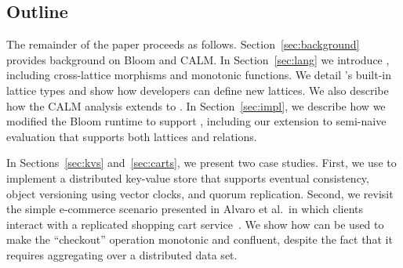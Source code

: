 % 

\subsection{Outline}
The remainder of the paper proceeds as follows.  Section~\ref{sec:background}
provides background on Bloom and CALM.  In Section~\ref{sec:lang} we introduce
\lang, including cross-lattice morphisms and monotonic functions. We detail
\lang's built-in lattice types and show how developers can define new lattices.
We also describe how the CALM analysis extends to \lang.  In
Section~\ref{sec:impl}, we describe how we modified the Bloom runtime to support
\lang, including our extension to semi-naive evaluation that supports both
lattices and relations.

In Sections~\ref{sec:kvs} and~\ref{sec:carts}, we present two case studies.
First, we use \lang to implement a distributed key-value store that supports
eventual consistency, object versioning using vector clocks, and quorum
replication. Second, we revisit the simple e-commerce scenario presented in
Alvaro et al.\ in which clients interact with a replicated shopping cart
service~\cite{Alvaro2011}. We show how \lang can be used to make the
``checkout'' operation monotonic and confluent, despite the fact that it
requires aggregating over a distributed data set.

